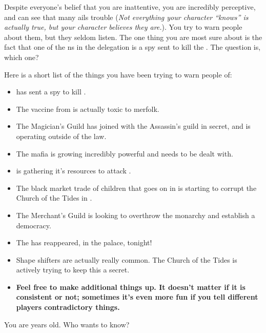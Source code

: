 \documentclass[char]{NeptuneBall}
\begin{document}
Despite everyone's belief that you are inattentive, you are incredibly perceptive, and can see that many ails trouble \pAtlantis{} (\emph{Not everything your character ``knows'' is actually true, but your character believes they are.}). You try to warn people about them, but they seldom listen. The one thing you are most sure about is the fact that one of the \pPacifica{}ns in the delegation is a spy sent to kill the \cKing{}. The question is, which one?

Here is a short list of the things you have been trying to warn people of:
\begin{itemize}
 \item \pPacifica{} has sent a spy to kill \cKing{}.
 \item The \ppolio{} vaccine from \pAmerica{} is actually toxic to merfolk.
 \item The Magician's Guild has joined with the Assassin's guild in secret, and is operating outside of the law.
 \item The mafia is growing incredibly powerful and needs to be dealt with.
 \item \pIndia{} is gathering it's resources to attack \pAtlantis{}.
 \item The black market trade of children that goes on in \pPacifica{} is starting to corrupt the Church of the Tides in \pAtlantis{}.
 \item The Merchant's Guild is looking to overthrow the monarchy and establish a democracy.
 \item The \iWishingStone{\MYname} has reappeared, in the palace, tonight!
 \item Shape shifters are actually really common. The Church of the Tides is actively trying to keep this a secret.
 \item {\bf Feel free to make additional things up. It doesn't matter if it is consistent or not; sometimes it's even more fun if you tell different players contradictory things.}
\end{itemize}

\begin{itemz}[Trivia]
  \item You are \cOsiris{\MYnumber} years old. Who wants to know?
\end{itemz}
\end{document}
